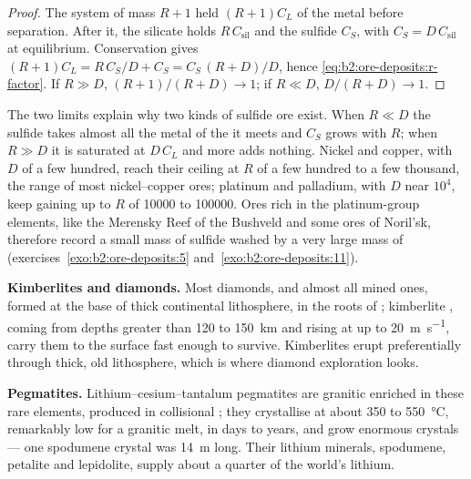 \begin{proof}
The system of mass $R + 1$ held $(R + 1)C_L$ of the metal before separation. After it, the silicate
holds $R\,C_{\mathrm{sil}}$ and the sulfide $C_S$, with $C_S = D\,C_{\mathrm{sil}}$ at equilibrium.
Conservation gives $(R + 1)C_L = R\,C_S/D + C_S = C_S\,(R + D)/D$, hence
\eqref{eq:b2:ore-deposits:r-factor}. If $R \gg D$, $(R + 1)/(R + D) \to 1$; if $R \ll D$,
$D/(R + D) \to 1$.
\end{proof}

The two limits explain why two kinds of sulfide ore exist. When $R \ll D$ the sulfide takes
almost all the metal of the  it meets and $C_S$ grows with $R$; when $R \gg D$ it is
saturated at $D\,C_L$ and more  adds nothing. Nickel and copper, with $D$ of a few hundred,
reach their ceiling at $R$ of a few hundred to a few thousand, the range of most nickel--copper
ores; platinum and palladium, with $D$ near $10^4$, keep gaining up to $R$ of \num{10000} to
\num{100000}. Ores rich in the platinum-group elements, like the Merensky Reef of the Bushveld and
some ores of Noril'sk, therefore record a small mass of sulfide washed by a very large mass of
 (exercises~\ref{exo:b2:ore-deposits:5} and~\ref{exo:b2:ore-deposits:11}).

\textbf{Kimberlites and diamonds.} Most diamonds, and almost all mined ones, formed at the base of
thick continental lithosphere, in the roots of ; kimberlite , coming from depths
greater than 120 to \qty{150}{km} and rising at up to \qty{20}{m.s^{-1}}, carry them to the
surface fast enough to survive. Kimberlites erupt preferentially through thick, old lithosphere,
which is where diamond exploration looks.

\textbf{Pegmatites.} Lithium--cesium--tantalum pegmatites are granitic  enriched in these rare
elements, produced in collisional ; they crystallise at about 350 to \qty{550}{\celsius},
remarkably low for a granitic melt, in days to years, and grow enormous crystals --- one
spodumene crystal was \qty{14}{m} long. Their lithium minerals, spodumene, petalite and
lepidolite, supply about a quarter of the world's lithium.


